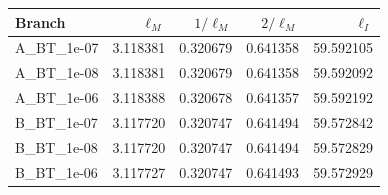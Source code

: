 \begin{tabular}{lrrrr}
\toprule
Branch & $\ell_M$ & $1/\ell_M$ & $2/\ell_M$ & $\ell_I$ \\
\midrule
A\_BT\_1e-07 & 3.118381 & 0.320679 & 0.641358 & 59.592105 \\
A\_BT\_1e-08 & 3.118381 & 0.320679 & 0.641358 & 59.592092 \\
A\_BT\_1e-06 & 3.118388 & 0.320678 & 0.641357 & 59.592192 \\
B\_BT\_1e-07 & 3.117720 & 0.320747 & 0.641494 & 59.572842 \\
B\_BT\_1e-08 & 3.117720 & 0.320747 & 0.641494 & 59.572829 \\
B\_BT\_1e-06 & 3.117727 & 0.320747 & 0.641493 & 59.572929 \\
\bottomrule
\end{tabular}
